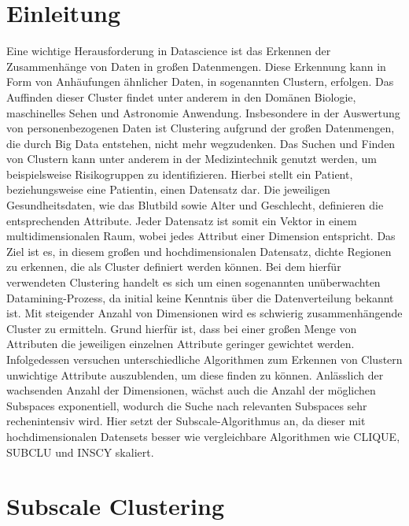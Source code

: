 \documentclass[utf8,biblatex]{lni}
\begin{document}
\section{Einleitung}
Eine wichtige Herausforderung in Datascience ist das Erkennen der Zusammenhänge von Daten in
großen Datenmengen.
Diese Erkennung kann in Form von Anhäufungen ähnlicher Daten, in sogenannten Clustern, erfolgen.
Das Auffinden dieser Cluster findet unter anderem in den Domänen Biologie, maschinelles Sehen und
Astronomie Anwendung.
Insbesondere in der Auswertung von personenbezogenen Daten ist Clustering aufgrund der großen
Datenmengen, die durch Big Data entstehen, nicht mehr wegzudenken. 
Das Suchen und Finden von Clustern kann unter anderem in der Medizintechnik genutzt werden, um
beispielsweise Risikogruppen zu identifizieren. 
Hierbei stellt ein Patient, beziehungsweise eine Patientin, einen Datensatz dar.
Die jeweiligen Gesundheitsdaten, wie das Blutbild sowie Alter und Geschlecht, definieren die
entsprechenden Attribute. 
Jeder Datensatz ist somit ein Vektor in einem multidimensionalen Raum,
wobei jedes Attribut einer Dimension entspricht.
Das Ziel ist es, in diesem großen und hochdimensionalen Datensatz, dichte Regionen zu erkennen,
die als Cluster definiert werden können.
Bei dem hierfür verwendeten Clustering handelt es sich um einen sogenannten
unüberwachten Datamining-Prozess, da initial keine Kenntnis über die
Datenverteilung bekannt ist.
Mit steigender Anzahl von Dimensionen wird es schwierig
zusammenhängende Cluster zu ermitteln.
Grund hierfür ist, dass bei einer großen Menge von Attributen die jeweiligen einzelnen
Attribute geringer gewichtet werden.
Infolgedessen versuchen unterschiedliche Algorithmen zum Erkennen von Clustern unwichtige 
Attribute auszublenden, um diese finden zu können. 
Anlässlich der wachsenden Anzahl der Dimensionen, wächst auch die Anzahl der möglichen
Subspaces exponentiell, wodurch die Suche nach relevanten Subspaces sehr rechenintensiv wird.  
Hier setzt der Subscale-Algorithmus an, da dieser mit hochdimensionalen Datensets besser wie
vergleichbare Algorithmen wie CLIQUE, SUBCLU und INSCY skaliert.


\section{Subscale Clustering}
\end{document}
